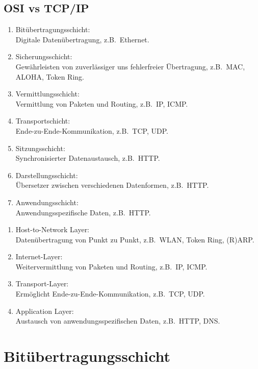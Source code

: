 \documentclass[a4paper,parskip=half*,DIV=15,fontsize=11pt]{scrartcl}
\begin{document}
\subsection{OSI vs TCP/IP}
\begin{minipage}[t]{0.5\textwidth}
\begin{enumerate}
	\item Bitübertragungsschicht:\\ Digitale Datenübertragung, z.B.\ Ethernet.
	\item Sicherungsschicht:\\ Gewährleisten von zuverlässiger uns fehlerfreier Übertragung, z.B.\ MAC, ALOHA, Token Ring.
	\item Vermittlungsschicht:\\ Vermittlung von Paketen und Routing, z.B.\ IP, ICMP.
	\item Transportschicht:\\ Ende-zu-Ende-Kommunikation, z.B.\ TCP, UDP.
	\item Sitzungsschicht:\\ Synchronisierter Datenaustausch, z.B.\ HTTP.
	\item Darstellungsschicht:\\ Übersetzer zwischen verschiedenen Datenformen, z.B.\ HTTP.
	\item Anwendungsschicht:\\ Anwendungsspezifische Daten, z.B.\ HTTP.
\end{enumerate}
\end{minipage}
\begin{minipage}[t]{0.5\textwidth}
\begin{enumerate}
	\item Host-to-Network Layer:\\ Datenübertragung von Punkt zu Punkt, z.B.\ WLAN, Token Ring, (R)ARP.
	\item Internet-Layer:\\ Weitervermittlung von Paketen und Routing, z.B.\ IP, ICMP.
	\item Transport-Layer:\\ Ermöglicht Ende-zu-Ende-Kommunikation, z.B.\ TCP, UDP.
	\item Application Layer:\\ Austausch von anwendungsspezifischen Daten, z.B.\ HTTP, DNS.
\end{enumerate}
\end{minipage}

\section{Bitübertragungsschicht}
\end{document}
